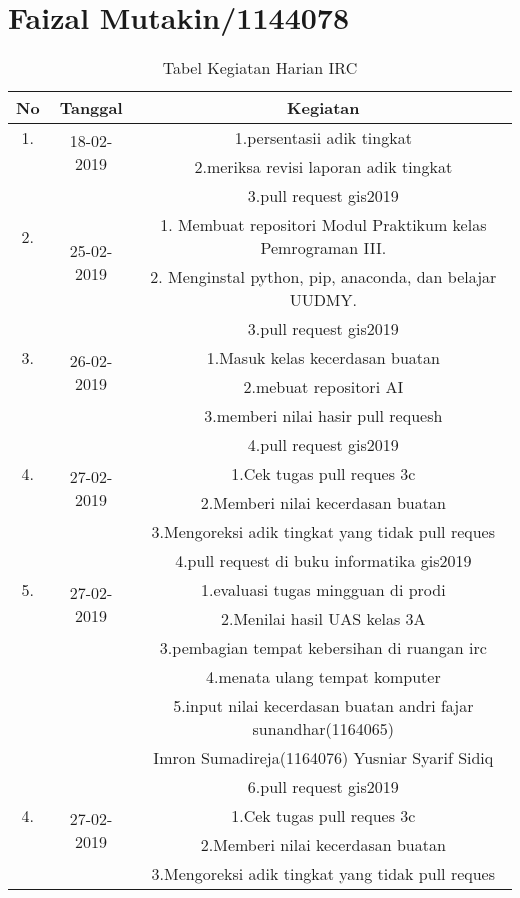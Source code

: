 \chapter{Faizal Mutakin/1144078}
\begin{table}[h]
\caption{Tabel Kegiatan Harian IRC}
\centering
\begin{tabular}{|c|c|c|}
\hline
No&Tanggal&Kegiatan\\
\hline
1.&\multirow{2}{*}{18-02-2019}&1.persentasii adik tingkat\\
&&2.meriksa revisi laporan adik tingkat\\
&&3.pull request gis2019\\
\hline
2.&\multirow{2}{*}{25-02-2019}&1. Membuat repositori Modul Praktikum kelas Pemrograman III.\\
&&2. Menginstal python, pip, anaconda, dan belajar UUDMY.\\
&&3.pull request gis2019\\
\hline
3.&\multirow{2}{*}{26-02-2019}&1.Masuk kelas kecerdasan buatan\\
&&2.mebuat repositori AI\\
&&3.memberi nilai hasir pull requesh\\
&&4.pull request gis2019\\
\hline
4.&\multirow{2}{*}{27-02-2019}&1.Cek tugas pull reques 3c\\
&&2.Memberi nilai kecerdasan buatan\\
&&3.Mengoreksi adik tingkat yang tidak pull reques\\
&&4.pull request di buku informatika gis2019\\
\hline
5.&\multirow{2}{*}{27-02-2019}&1.evaluasi tugas mingguan di prodi\\
&&2.Menilai hasil UAS kelas 3A\\
&&3.pembagian tempat kebersihan di ruangan irc\\
&&4.menata ulang tempat komputer\\
&&5.input nilai kecerdasan buatan andri fajar sunandhar(1164065)\\
&& Imron Sumadireja(1164076) Yusniar Syarif Sidiq \\
&&6.pull request gis2019\\
\hline
4.&\multirow{2}{*}{27-02-2019}&1.Cek tugas pull reques 3c\\
&&2.Memberi nilai kecerdasan buatan\\
&&3.Mengoreksi adik tingkat yang tidak pull reques\\
\hline
\end{tabular}
\label{table:contoh}
\end{table}